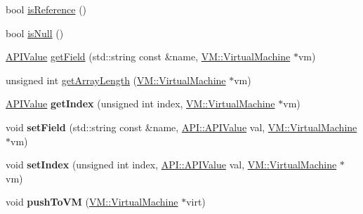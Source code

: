 \begin{DoxyCompactItemize}
\item 
bool \hyperlink{class_a_p_i_1_1_a_p_i_value_a9f5b34b9c70f6279dea8f556698ca1f6}{is\-Reference} ()
\item 
bool \hyperlink{class_a_p_i_1_1_a_p_i_value_a8a97634f469ced8407f4ca6cdd0f9898}{is\-Null} ()
\item 
\hyperlink{class_a_p_i_1_1_a_p_i_value}{A\-P\-I\-Value} \hyperlink{class_a_p_i_1_1_a_p_i_value_ac52ce1c55cc0a808016b557d1fb74995}{get\-Field} (std\-::string const \&name, \hyperlink{class_v_m_1_1_virtual_machine}{V\-M\-::\-Virtual\-Machine} $\ast$vm)
\item 
unsigned int \hyperlink{class_a_p_i_1_1_a_p_i_value_a1506f360a478ac864b76fec0409bc117}{get\-Array\-Length} (\hyperlink{class_v_m_1_1_virtual_machine}{V\-M\-::\-Virtual\-Machine} $\ast$vm)
\item 
\hypertarget{class_a_p_i_1_1_a_p_i_value_a799ace497f1988f95af61d6796d67a19}{\hyperlink{class_a_p_i_1_1_a_p_i_value}{A\-P\-I\-Value} {\bfseries get\-Index} (unsigned int index, \hyperlink{class_v_m_1_1_virtual_machine}{V\-M\-::\-Virtual\-Machine} $\ast$vm)}\label{class_a_p_i_1_1_a_p_i_value_a799ace497f1988f95af61d6796d67a19}

\item 
\hypertarget{class_a_p_i_1_1_a_p_i_value_aa516e6d20f842e2dfd60c1c59a697312}{void {\bfseries set\-Field} (std\-::string const \&name, \hyperlink{class_a_p_i_1_1_a_p_i_value}{A\-P\-I\-::\-A\-P\-I\-Value} val, \hyperlink{class_v_m_1_1_virtual_machine}{V\-M\-::\-Virtual\-Machine} $\ast$vm)}\label{class_a_p_i_1_1_a_p_i_value_aa516e6d20f842e2dfd60c1c59a697312}

\item 
\hypertarget{class_a_p_i_1_1_a_p_i_value_aa8a379bf602fc10523bfc4a4867dbc55}{void {\bfseries set\-Index} (unsigned int index, \hyperlink{class_a_p_i_1_1_a_p_i_value}{A\-P\-I\-::\-A\-P\-I\-Value} val, \hyperlink{class_v_m_1_1_virtual_machine}{V\-M\-::\-Virtual\-Machine} $\ast$vm)}\label{class_a_p_i_1_1_a_p_i_value_aa8a379bf602fc10523bfc4a4867dbc55}

\item 
\hypertarget{class_a_p_i_1_1_a_p_i_value_a54a170b1214ed9daf309c889b7daf77e}{void {\bfseries push\-To\-V\-M} (\hyperlink{class_v_m_1_1_virtual_machine}{V\-M\-::\-Virtual\-Machine} $\ast$virt)}\label{class_a_p_i_1_1_a_p_i_value_a54a170b1214ed9daf309c889b7daf77e}

\end{DoxyCompactItemize}
